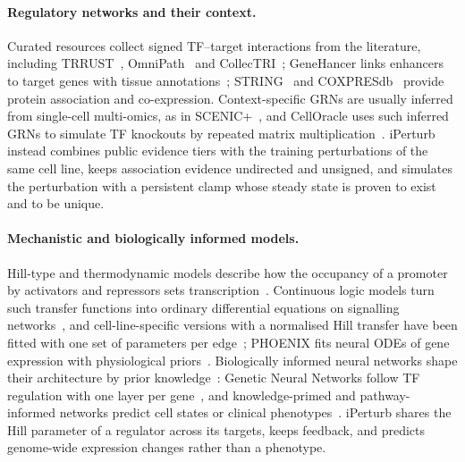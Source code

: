 \paragraph{Regulatory networks and their context.}
Curated resources collect signed TF--target interactions from the literature, including TRRUST~\cite{han2018trrust}, OmniPath~\cite{turei2016omnipath} and CollecTRI~\cite{mullerdott2023collectri}; GeneHancer links enhancers to target genes with tissue annotations~\cite{fishilevich2017genehancer}; STRING~\cite{szklarczyk2023string} and COXPRESdb~\cite{obayashi2023coxpresdb} provide protein association and co-expression.
Context-specific GRNs are usually inferred from single-cell multi-omics, as in SCENIC+~\cite{bravogonzalezbl2023scenicplus}, and CellOracle uses such inferred GRNs to simulate TF knockouts by repeated matrix multiplication~\cite{kamimoto2023dissecting}.
iPerturb instead combines public evidence tiers with the training perturbations of the same cell line, keeps association evidence undirected and unsigned, and simulates the perturbation with a persistent clamp whose steady state is proven to exist and to be unique.

\paragraph{Mechanistic and biologically informed models.}
Hill-type and thermodynamic models describe how the occupancy of a promoter by activators and repressors sets transcription~\cite{bintu2005transcriptional,alon2007introduction}.
Continuous logic models turn such transfer functions into ordinary differential equations on signalling networks~\cite{wittmann2009}, and cell-line-specific versions with a normalised Hill transfer have been fitted with one set of parameters per edge~\cite{eduati2017}; PHOENIX fits neural ODEs of gene expression with physiological priors~\cite{alhassen2024phoenix}.
Biologically informed neural networks shape their architecture by prior knowledge~\cite{selby2025beyond}: Genetic Neural Networks follow TF regulation with one layer per gene~\cite{eetemadi2019genetic}, and knowledge-primed and pathway-informed networks predict cell states or clinical phenotypes~\cite{fortelny2020knowledge,elmarakeby2021biologically,lotfollahi2023biologically}.
iPerturb shares the Hill parameter of a regulator across its targets, keeps feedback, and predicts genome-wide expression changes rather than a phenotype.

